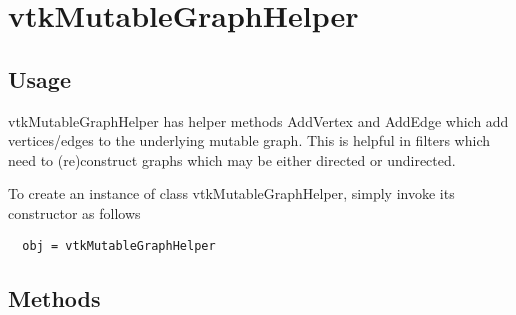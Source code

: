 \section{vtkMutableGraphHelper}

\subsection{Usage}

 vtkMutableGraphHelper has helper methods AddVertex and AddEdge which
 add vertices/edges to the underlying mutable graph. This is helpful in
 filters which need to (re)construct graphs which may be either directed
 or undirected.


To create an instance of class vtkMutableGraphHelper, simply
invoke its constructor as follows
\begin{verbatim}
  obj = vtkMutableGraphHelper
\end{verbatim}
\subsection{Methods}

